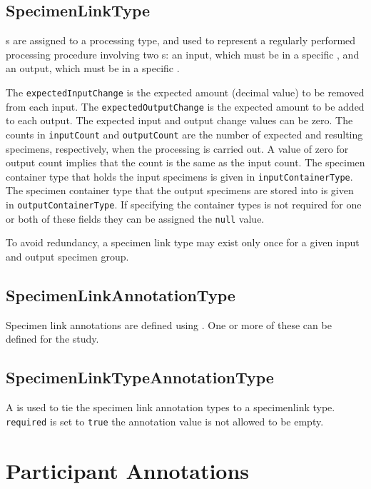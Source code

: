 \subsection*{SpecimenLinkType}

 s are assigned to
a processing type, and used to represent a regularly performed processing
procedure involving two s: an input, which must be in a
specific , and an output, which must be in a specific
.

The \texttt{expectedInputChange} is the expected amount (decimal value) to be
removed from each input. The \texttt{expectedOutputChange} is the expected
amount to be added to each output. The expected input and output change values
can be zero.  The counts in \texttt{inputCount} and \texttt{outputCount} are
the number of expected and resulting specimens, respectively, when the
processing is carried out. A value of zero for output count implies that the
count is the same as the input count. The specimen container type that holds
the input specimens is given in \texttt{inputContainerType}. The specimen
container type that the output specimens are stored into is given in
\texttt{outputContainerType}. If specifying the container types is not required
for one or both of these fields they can be assigned the \texttt{null} value.

To avoid redundancy, a specimen link type may exist only once for a given input
and output specimen group.

\subsection*{SpecimenLinkAnnotationType}

Specimen link annotations are defined using
. One or more of these can be defined
for the study.

\subsection*{SpecimenLinkTypeAnnotationType}

A  is used to tie the specimen
link annotation types to a specimenlink type. \texttt{required} is set to
\texttt{true} the annotation value is not allowed to be empty.

\section{Participant Annotations}
\label{sec:participant-annotations}

